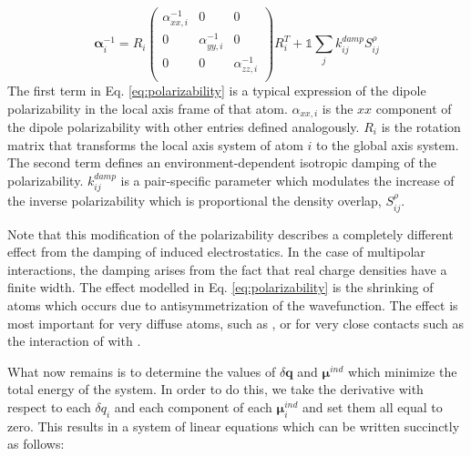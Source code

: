 \documentclass[journal=jctcce,manuscript=article]{achemso}
\begin{document}
\begin{equation}
  \bm{\alpha}^{-1}_i=
  R_i\begin{pmatrix}
    \alpha^{-1}_{xx,i} & 0 & 0 \\
    0 & \alpha^{-1}_{yy,i} & 0 \\
    0 & 0 & \alpha^{-1}_{zz,i} \\
  \end{pmatrix}R_i^T
    +\mathds{1}\sum_{j}k^{damp}_{ij}S_{ij}^\rho
    \label{eq:polarizability}
\end{equation}
\noindent
The first term in Eq. \ref{eq:polarizability} is a typical expression of the dipole polarizability
in the local axis frame of that atom. $\alpha_{xx,i}$ is the $xx$ component of the dipole polarizability
with other entries defined analogously. $R_i$ is the rotation matrix that transforms the local
axis system of atom $i$ to the global axis system. The second term defines an environment-dependent
isotropic damping of the polarizability.
$k_{ij}^{damp}$ is a pair-specific parameter which modulates the increase of the inverse polarizability
which is proportional the density overlap, $S_{ij}^\rho$.

Note that this modification of the polarizability describes a completely different
effect from the damping of induced electrostatics. In the case of multipolar interactions,
the damping arises from the fact that real charge densities have a finite width. The effect
modelled in Eq. \ref{eq:polarizability} is the shrinking of atoms which occurs due to
antisymmetrization of the wavefunction. The effect is most important for very diffuse atoms, such as , or for very close contacts such as the interaction of  with .


What now remains is to determine the values of $\delta \bm{q}$ and $\bm{\mu}^{ind}$
which minimize the total energy of the system. In order to do this, we take
the derivative with respect to each $\delta q_i$ and each component of each
$\bm{\mu}_i^{ind}$ and set them all equal to zero. This results in a system of linear
equations which can be written succinctly as follows:
\end{document}
